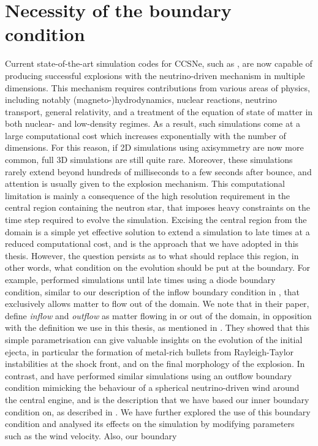  \label{chap:discussion}


\section{Necessity of the boundary condition}

Current state-of-the-art simulation codes for CCSNe, such as \flash, are now capable of producing successful explosions with the neutrino-driven mechanism in multiple dimensions. This mechanism requires contributions from various areas of physics, including notably (magneto-)hydrodynamics, nuclear reactions, neutrino transport, general relativity, and a treatment of the equation of state of matter in both nuclear- and low-density regimes. As a result, such simulations come at a large computational cost which increases exponentially with the number of dimensions. For this reason, if 2D simulations using axisymmetry are now more common, full 3D simulations are still quite rare. Moreover, these simulations rarely extend beyond hundreds of milliseconds to a few seconds after bounce, and attention is usually given to the explosion mechanism. This computational limitation is mainly a consequence of the high resolution requirement in the central region containing the neutron star, that imposes heavy constraints on the time step required to evolve the simulation. Excising the central region from the domain is a simple yet effective solution to extend a simulation to late times at a reduced computational cost, and is the approach that we have adopted in this thesis. However, the question persists as to what should replace this region, in other words, what condition on the evolution should be put at the boundary. For example, \cite{Sandoval2021} performed simulations until late times using a diode boundary condition, similar to our description of the inflow boundary condition in , that exclusively allows matter to flow out of the domain. We note that in their paper, \cite{Sandoval2021} define \emph{inflow} and \emph{outflow} as matter flowing in or out of the domain, in opposition with the definition we use in this thesis, as mentioned in . They showed that this simple parametrisation can give valuable insights on the evolution of the initial ejecta, in particular the formation of metal-rich bullets from Rayleigh-Taylor instabilities at the shock front, and on the final morphology of the explosion. In contrast, \cite{Stockinger2020} and \cite{Wongwathanarat2015} have performed similar simulations using an outflow boundary condition mimicking the behaviour of a spherical neutrino-driven wind around the central engine, and is the description that we have based our inner boundary condition on, as described in . We have further explored the use of this boundary condition and analysed its effects on the simulation by modifying parameters such as the wind velocity. Also, our boundary 
